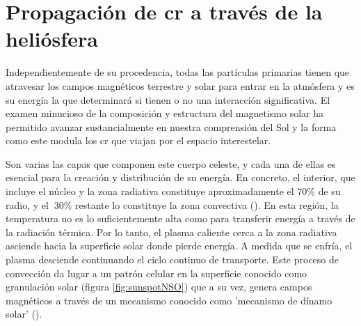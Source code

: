 \section{Propagación de \gls{cr} a través de la heliósfera}

Independientemente de su procedencia, todas las partículas primarias tienen que atravesar los campos magnéticos terrestre y solar para entrar en la atmósfera y es su energía la que determinará si tienen o no una interacción significativa. El examen minucioso de la composición y estructura del magnetismo solar ha permitido avanzar sustancialmente en nuestra comprensión del Sol y la forma como este modula los \gls{cr} que viajan por el espacio interestelar. 

Son varias las capas que componen este cuerpo celeste, y cada una de ellas es esencial para la creación y distribución de su energía. En concreto, el interior, que incluye el núcleo y la zona radiativa constituye aproximadamente el $70\%$ de su radio, y el $~30\%$ restante lo constituye la zona convectiva (\cite{Hanslmeier_2023}). En esta región, la temperatura no es lo suficientemente alta como para transferir energía a través de la radiación térmica. Por lo tanto, el plasma caliente cerca a la zona radiativa asciende hacia la superficie solar donde pierde energía. A medida que se enfría, el plasma desciende continuando el ciclo continuo de transporte. Este proceso de convección da lugar a un patrón celular en la superficie conocido como granulación solar (figura \ref{fig:sunspotNSO}) que a su vez, genera campos magnéticos a través de un mecanismo conocido como 'mecanismo de dínamo solar' (\cite{Sturrock_1986}).
